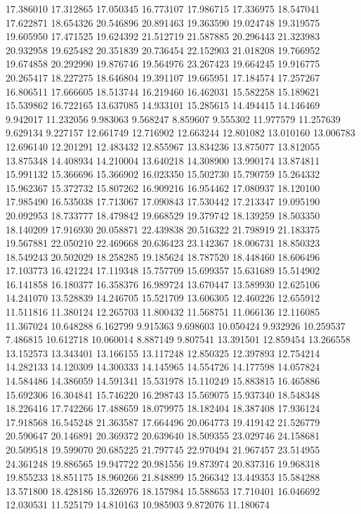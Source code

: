 17.386010
17.312865
17.050345
16.773107
17.986715
17.336975
18.547041
17.622871
18.654326
20.546896
20.891463
19.363590
19.024748
19.319575
19.605950
17.471525
19.624392
21.512719
21.587885
20.296443
21.323983
20.932958
19.625482
20.351839
20.736454
22.152903
21.018208
19.766952
19.674858
20.292990
19.876746
19.564976
23.267423
19.664245
19.916775
20.265417
18.227275
18.646804
19.391107
19.665951
17.184574
17.257267
16.806511
17.666605
18.513744
16.219460
16.462031
15.582258
15.189621
15.539862
16.722165
13.637085
14.933101
15.285615
14.494415
14.146469
9.942017
11.232056
9.983063
9.568247
8.859607
9.555302
11.977579
11.257639
9.629134
9.227157
12.661749
12.716902
12.663244
12.801082
13.010160
13.006783
12.696140
12.201291
12.483432
12.855967
13.834236
13.875077
13.812055
13.875348
14.408934
14.210004
13.640218
14.308900
13.990174
13.874811
15.991132
15.366696
15.366902
16.023350
15.502730
15.790759
15.264332
15.962367
15.372732
15.807262
16.909216
16.954462
17.080937
18.120100
17.985490
16.535038
17.713067
17.090843
17.530442
17.213347
19.095190
20.092953
18.733777
18.479842
19.668529
19.379742
18.139259
18.503350
18.140209
17.916930
20.058871
22.439838
20.516322
21.798919
21.183375
19.567881
22.050210
22.469668
20.636423
23.142367
18.006731
18.850323
18.549243
20.502029
18.258285
19.185624
18.787520
18.448460
18.606496
17.103773
16.421224
17.119348
15.757709
15.699357
15.631689
15.514902
16.141858
16.180377
16.358376
16.989724
13.670447
13.589930
12.625106
14.241070
13.528839
14.246705
15.521709
13.606305
12.460226
12.655912
11.511816
11.380124
12.265703
11.800432
11.568751
11.066136
12.116085
11.367024
10.648288
6.162799
9.915363
9.698603
10.050424
9.932926
10.259537
7.486815
10.612718
10.060014
8.887149
9.807541
13.391501
12.859454
13.266558
13.152573
13.343401
13.166155
13.117248
12.850325
12.397893
12.754214
14.282133
14.120309
14.300333
14.145965
14.554726
14.177598
14.057824
14.584486
14.386059
14.591341
15.531978
15.110249
15.883815
16.465886
15.692306
16.304841
15.746220
16.298743
15.569075
15.937340
18.548348
18.226416
17.742266
17.488659
18.079975
18.182404
18.387408
17.936124
17.918568
16.545248
21.363587
17.664496
20.064773
19.419142
21.526779
20.590647
20.146891
20.369372
20.639640
18.509355
23.029746
24.158681
20.509518
19.599070
20.685225
21.797745
22.970494
21.967457
23.514955
24.361248
19.886565
19.947722
20.981556
19.873974
20.837316
19.968318
19.855233
18.851175
18.960266
21.848899
15.266342
13.449353
15.584288
13.571800
18.428186
15.326976
18.157984
15.588653
17.710401
16.046692
12.030531
11.525179
14.810163
10.985903
9.872076
11.180674
